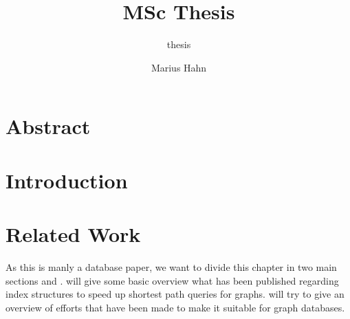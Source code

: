 \documentclass[11pt, rgb]{scrreprt}
\author{Marius Hahn}
\title{MSc Thesis}
\subtitle{thesis}
\begin{document}

\chapter*{Abstract}

\tableofcontents



%

\rmfamily 
\normalsize

\chapter{Introduction}

\chapter{Related Work} 

As this is manly a database paper, we want to divide this chapter in two main sections  and .  
will give some basic overview what has been published regarding index structures to speed up shortest path queries for graphs.  will try 
to give an overview of efforts that have been made to make \cite[Customizable Contraction Hierarchies]{CCH} it suitable for graph databases.
\end{document}
